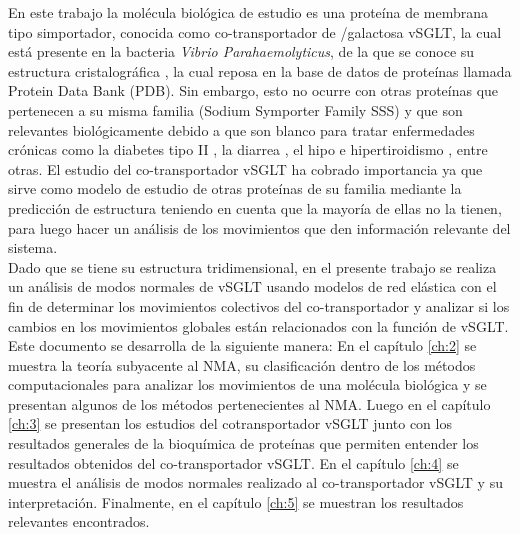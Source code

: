 En este trabajo la mol\'{e}cula biol\'{o}gica de estudio es una prote\'{i}na de membrana tipo simportador, conocida como co-transportador de /galactosa vSGLT, la cual est\'{a} presente en la bacteria \textit{Vibrio Parahaemolyticus}, de la que se conoce su estructura cristalogr\'{a}fica \cite{Faham2008}, la cual reposa en la base de datos de prote\'{i}nas llamada Protein Data Bank (PDB). Sin embargo, esto no ocurre con otras prote\'{i}nas que pertenecen a su misma familia (Sodium Symporter Family SSS) y que son relevantes biol\'{o}gicamente debido a que son blanco  para tratar enfermedades cr\'{o}nicas como la diabetes tipo II \cite{Bisha2014}, la diarrea \cite{Hamilton2013}, el hipo e hipertiroidismo \cite{Ferrandino2016}, entre otras. El estudio del co-transportador vSGLT ha cobrado importancia ya que sirve como modelo de estudio de otras prote\'{i}nas de su familia mediante la predicci\'{o}n de estructura teniendo en cuenta que la mayor\'{i}a de ellas no la tienen, para luego hacer un an\'{a}lisis de los movimientos que den informaci\'{o}n relevante del sistema.\\

Dado que se tiene su estructura tridimensional, en el  presente trabajo se realiza un an\'{a}lisis de modos normales de vSGLT usando modelos de red el\'{a}stica con el fin de determinar los movimientos colectivos del co-transportador y analizar si los cambios en los movimientos globales est\'{a}n relacionados con la funci\'{o}n de vSGLT.\\

Este documento se desarrolla de la siguiente manera: En el cap\'{i}tulo \ref{ch:2} se muestra la teor\'{i}a subyacente al NMA, su clasificaci\'{o}n dentro de los m\'{e}todos computacionales para analizar los movimientos de una mol\'{e}cula biol\'{o}gica y se presentan algunos de los m\'{e}todos pertenecientes al NMA. Luego en el cap\'{i}tulo \ref{ch:3} se presentan los estudios del cotransportador vSGLT junto con los resultados generales de la bioqu\'{i}mica de prote\'{i}nas que permiten entender los resultados obtenidos del co-transportador vSGLT. En el cap\'{i}tulo \ref{ch:4} se muestra el an\'{a}lisis de modos normales realizado al co-transportador vSGLT y su interpretaci\'{o}n. Finalmente, en el cap\'{i}tulo \ref{ch:5} se muestran los resultados relevantes encontrados.
